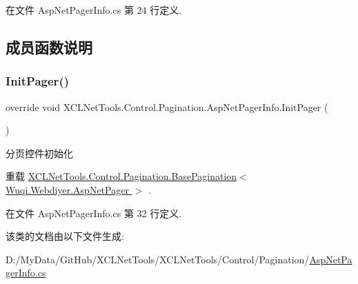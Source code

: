 在文件 Asp\+Net\+Pager\+Info.\+cs 第 24 行定义.



\subsection{成员函数说明}
\mbox{\label{class_x_c_l_net_tools_1_1_control_1_1_pagination_1_1_asp_net_pager_info_a46b208799b1d020c45571657c707ddf0}} 
\subsubsection{\texorpdfstring{Init\+Pager()}{InitPager()}}
{\footnotesize\ttfamily override void X\+C\+L\+Net\+Tools.\+Control.\+Pagination.\+Asp\+Net\+Pager\+Info.\+Init\+Pager (\begin{DoxyParamCaption}{ }\end{DoxyParamCaption})\hspace{0.3cm}{\ttfamily [virtual]}}



分页控件初始化 



重载 \hyperlink{class_x_c_l_net_tools_1_1_control_1_1_pagination_1_1_base_pagination_ab3485196d5422f857f29f96bfbb2faa9}{X\+C\+L\+Net\+Tools.\+Control.\+Pagination.\+Base\+Pagination$<$ Wuqi.\+Webdiyer.\+Asp\+Net\+Pager $>$} .



在文件 Asp\+Net\+Pager\+Info.\+cs 第 32 行定义.



该类的文档由以下文件生成\+:\begin{DoxyCompactItemize}
\item 
D\+:/\+My\+Data/\+Git\+Hub/\+X\+C\+L\+Net\+Tools/\+X\+C\+L\+Net\+Tools/\+Control/\+Pagination/\hyperlink{_asp_net_pager_info_8cs}{Asp\+Net\+Pager\+Info.\+cs}\end{DoxyCompactItemize}
